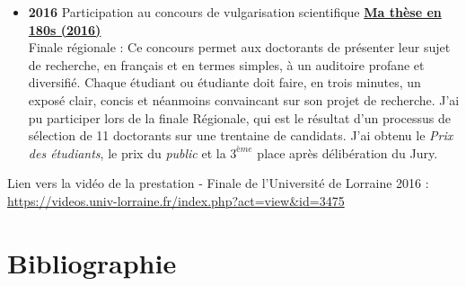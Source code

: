\documentclass[
  11pt,
]{article}
\providecommand{\tightlist}{%
  \setlength{\itemsep}{0pt}\setlength{\parskip}{0pt}}\usepackage{longtable,booktabs,array}
\begin{document}
\begin{itemize}
\tightlist
\item
  \textbf{2016} Participation au concours de vulgarisation scientifique
  \href{http://videos.univ-lorraine.fr/index.php?act=view&id=3475}{\textbf{Ma thèse en 180s (2016)}}\\
  Finale régionale : Ce concours permet aux doctorants de présenter leur
  sujet de recherche, en français et en termes simples, à un auditoire
  profane et diversifié. Chaque étudiant ou étudiante doit faire, en
  trois minutes, un exposé clair, concis et néanmoins convaincant sur
  son projet de recherche. J'ai pu participer lors de la finale
  Régionale, qui est le résultat d'un processus de sélection de 11
  doctorants sur une trentaine de candidats. J'ai obtenu le
  \textit{Prix des étudiants}, le prix du \textit{public} et la
  \(3^{ème}\) place après délibération du Jury.
\end{itemize}

Lien vers la vidéo de la prestation - Finale de l'Université de Lorraine
2016 : \url{https://videos.univ-lorraine.fr/index.php?act=view&id=3475}

\newpage

\hypertarget{bibliographie}{%
\section{Bibliographie}\label{bibliographie}}
\end{document}
